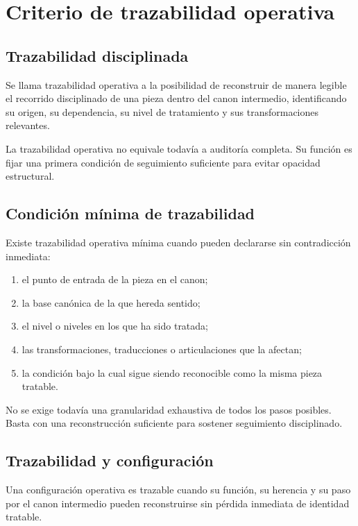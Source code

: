 \chapter{Criterio de trazabilidad operativa}

\section{Trazabilidad disciplinada}
\begin{definition}
Se llama trazabilidad operativa a la posibilidad de reconstruir de manera legible el recorrido disciplinado de una pieza dentro del canon intermedio, identificando su origen, su dependencia, su nivel de tratamiento y sus transformaciones relevantes.
\end{definition}

\begin{observation}
La trazabilidad operativa no equivale todavía a auditoría completa. Su función es fijar una primera condición de seguimiento suficiente para evitar opacidad estructural.
\end{observation}

\section{Condición mínima de trazabilidad}
\begin{definition}
Existe trazabilidad operativa mínima cuando pueden declararse sin contradicción inmediata:
\begin{enumerate}
  \item el punto de entrada de la pieza en el canon;
  \item la base canónica de la que hereda sentido;
  \item el nivel o niveles en los que ha sido tratada;
  \item las transformaciones, traducciones o articulaciones que la afectan;
  \item la condición bajo la cual sigue siendo reconocible como la misma pieza tratable.
\end{enumerate}
\end{definition}

\begin{observation}
No se exige todavía una granularidad exhaustiva de todos los pasos posibles. Basta con una reconstrucción suficiente para sostener seguimiento disciplinado.
\end{observation}

\section{Trazabilidad y configuración}
\begin{definition}
Una configuración operativa es trazable cuando su función, su herencia y su paso por el canon intermedio pueden reconstruirse sin pérdida inmediata de identidad tratable.
\end{definition}

